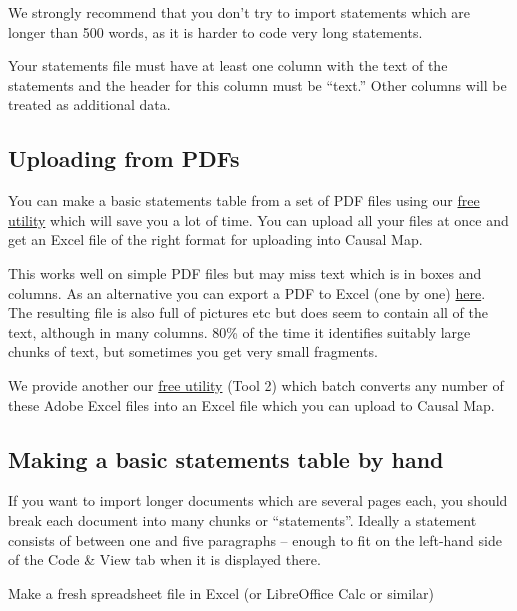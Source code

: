 \documentclass[
]{book}
\begin{document}
We strongly recommend that you don't try to import statements which are longer than 500 words, as it is harder to code very long statements.

Your statements file must have at least one column with the text of the statements and the header for this column must be ``text.'' Other columns will be treated as additional data.

\hypertarget{uploading-from-pdfs}{%
\subsection{Uploading from PDFs}\label{uploading-from-pdfs}}

You can make a basic statements table from a set of PDF files using our \href{https://causalmap.shinyapps.io/pdf2excel/}{free utility} which will save you a lot of time. You can upload all your files at once and get an Excel file of the right format for uploading into Causal Map.

This works well on simple PDF files but may miss text which is in boxes and columns. As an alternative you can export a PDF to Excel (one by one) \href{https://www.adobe.com/uk/acrobat/online/pdf-to-excel.html}{here}. The resulting file is also full of pictures etc but does seem to contain all of the text, although in many columns. 80\% of the time it identifies suitably large chunks of text, but sometimes you get very small fragments.

We provide another our \href{https://causalmap.shinyapps.io/pdf2excel/}{free utility} (Tool 2) which batch converts any number of these Adobe Excel files into an Excel file which you can upload to Causal Map.

\hypertarget{making-a-basic-statements-table-by-hand}{%
\subsection{Making a basic statements table by hand}\label{making-a-basic-statements-table-by-hand}}

If you want to import longer documents which are several pages each, you should break each document into many chunks or ``statements''. Ideally a statement consists of between one and five paragraphs -- enough to fit on the left-hand side of the Code \& View tab when it is displayed there.

Make a fresh spreadsheet file in Excel (or LibreOffice Calc or similar)
\end{document}
